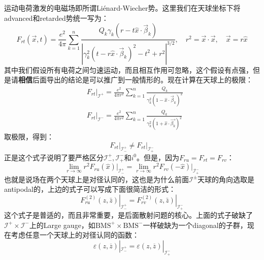 运动电荷激发的电磁场即所谓Li\'enard\mbox{-}Wiecher势\cite{Jackson1998ClassicalE3}。这里我们在天球坐标下将advanced和retarded势统一写为：
\begin{equation}
	F_{rt}(\vec{x},t)=\frac{e^2}{4\pi}\sum_{k=1}^n\frac{Q_k\gamma_k\left(r-t\hat{x}\cdot\vec{\beta}_k\right)}{\left|\gamma_k^2\left(t-r\hat{x}\cdot\vec{\beta}_k\right)^2-t^2+r^2\right|^{3/2}},\quad r^2=\vec{x}\cdot\vec{x},\quad\vec{x}=r\hat{x}
\end{equation}
其中我们假设所有电荷之间匀速运动，而且相互作用可忽略，这个假设有点强，但是请\textbf{相信}后面导出的结论是可以推广到一般情形的。现在计算在天球上的极限：
\begin{equation}
	\begin{aligned}
		&\left.F_{rt}\right|_{\mathcal{I}^{+}}=\frac{e^{2}}{4\pi r^{2}}\sum_{k=1}^{n}\frac{Q_{k}}{\gamma_{k}^{2}(1-\hat{x}\cdot\vec{\beta}_{k})^{2}}\\
		&\left.F_{rt}\right|_{\mathcal{I}^{-}}=\frac{e^{2}}{4\pi r^{2}}\sum_{k=1}^{n}\frac{Q_{k}}{\gamma_{k}^{2}(1+\hat{x}\cdot\vec{\beta_{k}})^{2}}
	\end{aligned}
\end{equation}
取极限，得到：
\begin{equation}
	\boxed{
	\left.F_{rt}\right|_{\mathcal{I}^{+}_-}\neq \left.F_{rt}\right|_{\mathcal{I}^{-}_+}}
\end{equation}
正是这个式子说明了要严格区分$\mathcal{I}^{+}_-,\mathcal{I}^{-}_{+}$和$i^0$。但是，因为$F_{ru}=F_{rt}=F_{rv}$：
\begin{equation}
	\boxed{
		\lim\limits_{r\to\infty}r^2F_{ru}(\hat{x})\Big|_{\mathcal{I}_{-}^+}=\lim\limits_{r\to\infty}r^2F_{rv}(-\hat{x})\Big|_{\mathcal{I}_{+}^-}
	}
\end{equation}
也就是说场在两个天球上是对径认同的，这也是为什么前面$\mathcal{I}^{\pm}$天球的角向选取是antipodal的，上边的式子可以写成下面很简洁的形式：
\begin{equation}\label{24.12}
	\boxed{
	\left.F_{ru}^{(2)}(z,\bar z)\right|_{\mathcal{I}^{+}_-}=\left.F_{rv}^{(2)}(z,\bar z)\right|_{\mathcal{I}^{-}_+}
	}
\end{equation}
这个式子是普适的，而且非常重要，是后面散射问题的核心。上面的式子破缺了$\mathcal{I}^+\times\mathcal{I}^-$上的Large gauge，如$\mathrm{BMS}^+\times \mathrm{BMS}^-$一样破缺为一个diagonal的子群，现在考虑任意一个天球上的对径认同的函数：
\begin{equation}
	\varepsilon(z,\overline{z})|_{\mathcal{I}_{-}^{+}}=\varepsilon(z,\overline{z})|_{\mathcal{I}_{+}^{-}}
\end{equation}
